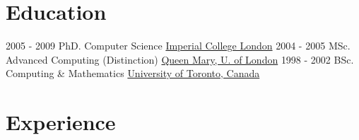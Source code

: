 \documentclass[letterpaper]{twentysecondcv} %
\begin{document}
\makeprofile %

\section{Education}

\begin{twenty} %
	\twentyitem
    	{2005 - 2009}
        {}
        {PhD. Computer Science }
        {\href{http://www.doc.ic.ac.uk/}{Imperial College London}}
        {}
        {}
	\twentyitem
    	{2004 - 2005}
		{}
        {MSc. Advanced Computing \textnormal{(Distinction)}}
        {\href{http://www.qmul.ac.uk/}{Queen Mary, U. of London}}
        {}
        {}
    	\twentyitem
    	{1998 - 2002}
		{}
        {BSc. Computing \& Mathematics}
        {\href{http://www.utoronto.ca/}{University of Toronto, Canada}}
        {}

\end{twenty}



\section{Experience}
\end{document}
